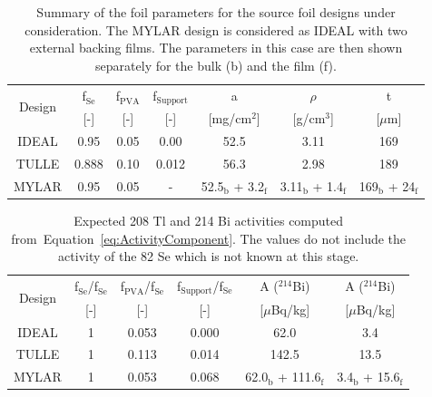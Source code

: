 \documentclass[main.tex]{subfiles}
\begin{document}
\begin{table}[h!]
\centering
\begin{tabular}{c|c|c|c|c|c|c}
\multirow{2}{*}{Design} & f$_\text{Se}$ & f$_\text{PVA}$ & f$_\text{Support}$ & a                  & $\rho$            & t \\
                        & [-]           & [-]            & [-]                & [mg/cm$^\text{2}$] & [g/cm$^\text{3}$] & [$\mu$m] \\[0.1cm]
\toprule
IDEAL & 0.95  & 0.05 & 0.00  & 52.5                             & 3.11 & 169 \\[0.1cm]
TULLE & 0.888 & 0.10 & 0.012 & 56.3                             & 2.98 & 189 \\[0.1cm]
MYLAR & 0.95  & 0.05 & -     & 52.5$_\text{b}$ + 3.2$_\text{f}$ & 3.11$_\text{b}$ + 1.4$_\text{f}$ & 169$_\text{b}$ + 24$_\text{f}$ \\[0.1cm]
\bottomrule
\end{tabular}
\caption{Summary of the foil parameters for the source foil designs under consideration. The MYLAR design is considered as IDEAL with two external backing films. The parameters in this case are then shown separately for the bulk (b) and the film (f).}
\label{Tab:SummaryParametersSourceFoilDesign}
\end{table}



\begin{table}[h!]
\centering
\begin{tabular}{c|c|c|c|c|c}
\multirow{2}{*}{Design} & f$_\text{Se}$/f$_\text{Se}$ & f$_\text{PVA}$/f$_\text{Se}$ & f$_\text{Support}$/f$_\text{Se}$ & A ($^{\text{214}}$Bi) & A ($^{\text{214}}$Bi)  \\
& [-]   & [-]   & [-]   & [$\mu$Bq/kg] & [$\mu$Bq/kg] \\[0.1cm]
\toprule
IDEAL & 1 & 0.053 & 0.000 & 62.0                               & 3.4   \\[0.1cm]
TULLE & 1 & 0.113 & 0.014 & 142.5                              & 13.5  \\[0.1cm]
MYLAR & 1 & 0.053 & 0.068 & 62.0$_\text{b}$ + 111.6$_\text{f}$ & 3.4$_\text{b}$ + 15.6$_\text{f}$  \\[0.1cm]
\bottomrule
\end{tabular}
\caption{Expected 208 Tl and 214 Bi activities computed from~Equation~\ref{eq:ActivityComponent}. The values do not include the activity of the 82 Se which is not known at this stage.}
\label{Tab:ExpectedBkgSourceFoilDesign}
\end{table}
\end{document}
